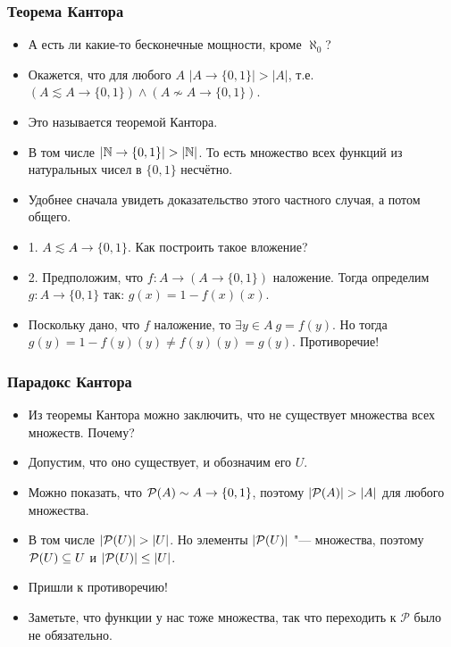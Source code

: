 \documentclass[10pt]{beamer}
\begin{document}
\begin{frame}
    \frametitle{Теорема Кантора}
    \begin{itemize}
        \item А есть ли какие-то бесконечные мощности, кроме $\aleph_0$?
        \pause
        \item Окажется, что для любого $A$ $|A \to \{0,1\}| > |A|$, т.е. $(A \lesssim A \to \{0,1\}) \land (A \nsim A \to \{0,1\})$.
        \item Это называется теоремой Кантора.
        \pause
        \item В том числе $|\mathbb{N} \to \{0,1\}| > |\mathbb{N}|$. То есть множество всех функций из натуральных чисел в $\{0,1\}$ несчётно.
        \item Удобнее сначала увидеть доказательство этого частного случая, а потом общего.
        \pause
        \item 1. $A \lesssim A \to \{0,1\}$. Как построить такое вложение?
        \item 2. Предположим, что $f: A \to (A \to \{0,1\})$ наложение. Тогда определим $g: A \to \{0,1\}$ так: $g(x) = 1 - f(x)(x)$.
        \item Поскольку дано, что $f$ наложение, то $\exists y \in A~g = f(y)$. Но тогда \pause $g(y) = 1 - f(y)(y) \neq f(y)(y) = g(y)$. Противоречие!
    \end{itemize}
\end{frame}

\begin{frame}
    \frametitle{Парадокс Кантора}
    \begin{itemize}
        \item Из теоремы Кантора можно заключить, что не существует множества всех множеств. Почему?
        \pause
        \item Допустим, что оно существует, и обозначим его $U$.
        \item Можно показать, что $\mathcal{P}({A}) \sim A \to \{0,1\}$, поэтому $|\mathcal{P}({A})| > |A|$ для любого множества.
        \item В том числе $|\mathcal{P}({U})| > |U|$. Но элементы $|\mathcal{P}({U})|$ "--- множества, поэтому \pause $\mathcal{P}({U}) \subseteq U$ и \pause $|\mathcal{P}({U})| \leq |U|$.
        \item Пришли к противоречию!
        \pause
        \item Заметьте, что функции у нас тоже множества, так что переходить к $\mathcal{P}$ было не обязательно.
    \end{itemize}
\end{frame}
\end{document}
